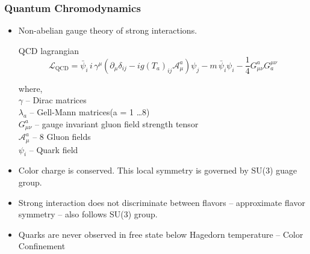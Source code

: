 \documentclass[aspectratio=1610]{beamer}
\begin{document}
\begin{frame}
\frametitle{Quantum Chromodynamics} 

\begin{itemize}

\item Non-abelian gauge theory of strong interactions.

\begin{block}{QCD lagrangian}
\begin{equation}
\mathcal{L}_\mathrm{QCD} = \bar{\psi}_i \,  i \, \gamma^\mu \left( \partial_\mu \delta_{ij} - i g \left( T_a \right)_{ij} \mathcal{A}^a_\mu \right) \psi_j  - m\, \bar{\psi}_i  \psi_i - \frac{1}{4}G^a_{\mu \nu} G^{\mu \nu}_a
\end{equation}	
\end{block}		
	
where, \\
	\hspace*{20mm}		$\gamma$  -- Dirac matrices\\
	\hspace*{20mm}		$\lambda_a$  -- Gell-Mann matrices(a = 1 \ldots 8)\\
	\hspace*{20mm}		$G^a_{\mu \nu}$ -- gauge invariant gluon field strength tensor\\
	\hspace*{20mm}		$\mathcal{A}^a_\mu$  -- 8 Gluon fields\\
	\hspace*{21mm}		$\psi_i$  -- Quark field\\

\item Color charge is conserved. This local symmetry is governed by SU(3) guage group.

\item Strong interaction does not discriminate between flavors -- approximate flavor symmetry -- also follows SU(3) group.

\item Quarks are never observed in free state below Hagedorn temperature -- Color Confinement 


\end{itemize}

\end{frame}

\end{document}
